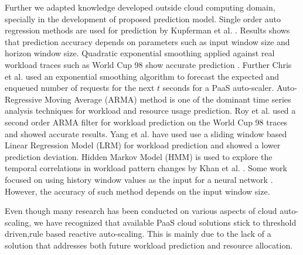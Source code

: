 Further we adapted knowledge developed outside cloud computing domain, specially in the development of proposed prediction model. Single order auto regression methods are used for prediction by Kupferman et al. \cite{Kupferman_2009}. Results shows that prediction accuracy depends on parameters such as input window size and horizon window size. Quadratic exponential smoothing applied against real workload traces such as World Cup 98 \cite{WorldCup_1998} show accurate prediction \cite{Mi_2010}. Further Chris et al. \cite{Bunch_2012} used an exponential smoothing algorithm to forecast the expected and enqueued number of requests for the next $t$ seconds for a PaaS auto-scaler. Auto-Regressive Moving Average (ARMA) method is one of the dominant time series analysis techniques for workload and resource usage prediction. Roy et al. \cite{Roy_2011} used a second order ARMA filter for workload prediction on the World Cup 98 traces and showed accurate results. Yang et al. \cite{Yang_2013} have used use a sliding window based Linear Regression Model (LRM) for workload prediction and showed a lower prediction deviation. Hidden Markov Model (HMM) is used to explore the temporal correlations in workload pattern changes by Khan et al. \cite{Khan_2012}. Some work focused on using history window values as the input for a neural network \cite{Islam_2012}. However, the accuracy of such method depends on the input window size.

Even though many research has been conducted on various aspects of cloud auto-scaling, we have recognized that available PaaS cloud solutions stick to threshold driven,rule based reactive auto-scaling. This is mainly due to the lack of a solution that addresses both future workload prediction and resource allocation.